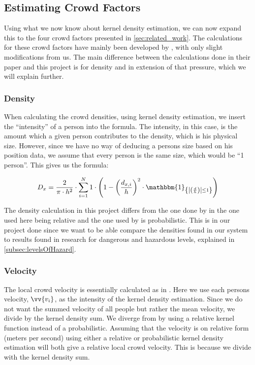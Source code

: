 \subsection{Estimating Crowd Factors}
Using what we now know about kernel density estimation, we can now expand this to the four crowd factors presented in \cref{sec:related_work}. The calculations for these crowd factors have mainly been developed by \citet{wirz2012inferring}, with only slight modifications from us. The main difference between the calculations done in their paper and this project is for density and in extension of that pressure, which we will explain further.

\subsubsection{Density}
When calculating the crowd densities, using kernel density estimation, we insert the \enquote{intensity} of a person into the formula. The intensity, in this case, is the amount which a given person contributes to the density, which is his physical size. However, since we have no way of deducing a persons size based on his position data, we assume that every person is the same size, which would be \enquote{1 person}. This gives us the formula:

\begin{equation}
D_x = \frac{2}{\pi \cdot h^2} \cdot \sum_{i=1}^N 1 \cdot \left(1-\left(\frac{d_{x,i}}{h}\right)^2 \cdot \mathbbm{1}_{\left\{\left|\left(\frac{d}{h}\right)\right| \leq 1\right\}}\right)
\end{equation}

The density calculation in this project differs from the one done by \citet{wirz2012inferring} in the one used here being relative and the one used by \citet{wirz2012inferring} is probabilistic. This is in our project done since we want to be able compare the densities found in our system to results found in research for dangerous and hazardous levels, explained in \cref{subsec:levelsOfHazard}.

\subsubsection{Velocity}
The local crowd velocity is essentially calculated as in \citet{wirz2012inferring}. Here we use each persons velocity, $\vv{v_i}$, as the intensity of the kernel density estimation. Since we do not want the summed velocity of all people but rather the mean velocity, we divide by the kernel density sum. We diverge from \citet{wirz2012inferring} by using a relative kernel function instead of a probabilistic. Assuming that the velocity is on relative form (meters per second) using either a relative or probabilistic kernel density estimation will both give a relative local crowd velocity. This is because we divide with the kernel density sum.

